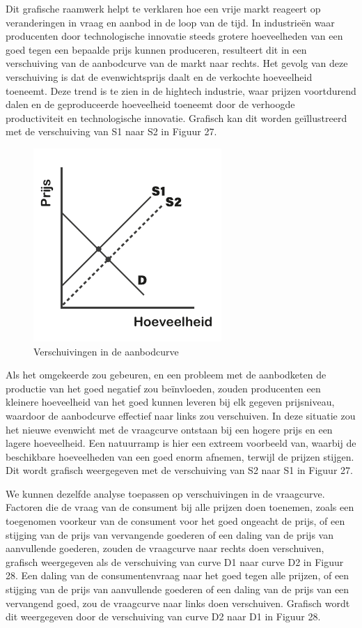 Dit grafische raamwerk helpt te verklaren hoe een vrije markt reageert op veranderingen in vraag en aanbod in de loop van de tijd. In industrieën waar producenten door technologische innovatie steeds grotere hoeveelheden van een goed tegen een bepaalde prijs kunnen produceren, resulteert dit in een verschuiving van de aanbodcurve van de markt naar rechts. Het gevolg van deze verschuiving is dat de evenwichtsprijs daalt en de verkochte hoeveelheid toeneemt. Deze trend is te zien in de hightech industrie, waar prijzen voortdurend dalen en de geproduceerde hoeveelheid toeneemt door de verhoogde productiviteit en technologische innovatie. Grafisch kan dit worden geïllustreerd met de verschuiving van S1 naar S2 in Figuur 27.

\begin{figure}[h]
\centering
    \includegraphics[]{figures/fig27.pdf}
    \caption[Verschuivingen in de aanbodcurve]{Verschuivingen in de aanbodcurve}
    \label{fig27}
\end{figure}

Als het omgekeerde zou gebeuren, en een probleem met de aanbodketen de productie van het goed negatief zou beïnvloeden, zouden producenten een kleinere hoeveelheid van het goed kunnen leveren bij elk gegeven prijsniveau, waardoor de aanbodcurve effectief naar links zou verschuiven. In deze situatie zou het nieuwe evenwicht met de vraagcurve ontstaan bij een hogere prijs en een lagere hoeveelheid. Een natuurramp is hier een extreem voorbeeld van, waarbij de beschikbare hoeveelheden van een goed enorm afnemen, terwijl de prijzen stijgen. Dit wordt grafisch weergegeven met de verschuiving van S2 naar S1 in Figuur 27.

We kunnen dezelfde analyse toepassen op verschuivingen in de vraagcurve. Factoren die de vraag van de consument bij alle prijzen doen toenemen, zoals een toegenomen voorkeur van de consument voor het goed ongeacht de prijs, of een stijging van de prijs van vervangende goederen of een daling van de prijs van aanvullende goederen, zouden de vraagcurve naar rechts doen verschuiven, grafisch weergegeven als de verschuiving van curve D1 naar curve D2 in Figuur 28. Een daling van de consumentenvraag naar het goed tegen alle prijzen, of een stijging van de prijs van aanvullende goederen of een daling van de prijs van een vervangend goed, zou de vraagcurve naar links doen verschuiven. Grafisch wordt dit weergegeven door de verschuiving van curve D2 naar D1 in Figuur 28.

